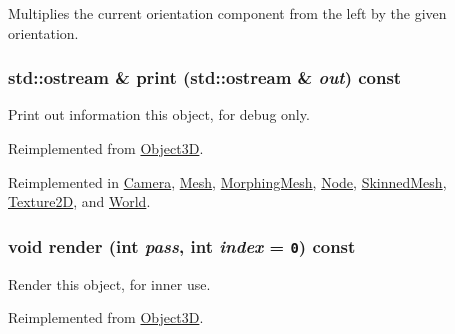 Multiplies the current orientation component from the left by the given orientation. \hypertarget{classm3g_1_1Transformable_6fea17fa1532df3794f8cb39cb4f911f}{
\subsubsection[{print}]{\setlength{\rightskip}{0pt plus 5cm}std::ostream \& print (std::ostream \& {\em out}) const}}
\label{classm3g_1_1Transformable_6fea17fa1532df3794f8cb39cb4f911f}


Print out information this object, for debug only. 

Reimplemented from \hyperlink{classm3g_1_1Object3D_6fea17fa1532df3794f8cb39cb4f911f}{Object3D}.

Reimplemented in \hyperlink{classm3g_1_1Camera_6fea17fa1532df3794f8cb39cb4f911f}{Camera}, \hyperlink{classm3g_1_1Mesh_6fea17fa1532df3794f8cb39cb4f911f}{Mesh}, \hyperlink{classm3g_1_1MorphingMesh_6fea17fa1532df3794f8cb39cb4f911f}{MorphingMesh}, \hyperlink{classm3g_1_1Node_6fea17fa1532df3794f8cb39cb4f911f}{Node}, \hyperlink{classm3g_1_1SkinnedMesh_6fea17fa1532df3794f8cb39cb4f911f}{SkinnedMesh}, \hyperlink{classm3g_1_1Texture2D_6fea17fa1532df3794f8cb39cb4f911f}{Texture2D}, and \hyperlink{classm3g_1_1World_6fea17fa1532df3794f8cb39cb4f911f}{World}.\hypertarget{classm3g_1_1Transformable_1efcb1973989d9963d5bd6d03065d389}{
\subsubsection[{render}]{\setlength{\rightskip}{0pt plus 5cm}void render (int {\em pass}, \/  int {\em index} = {\tt 0}) const}}
\label{classm3g_1_1Transformable_1efcb1973989d9963d5bd6d03065d389}


Render this object, for inner use. 

Reimplemented from \hyperlink{classm3g_1_1Object3D_1efcb1973989d9963d5bd6d03065d389}{Object3D}.

